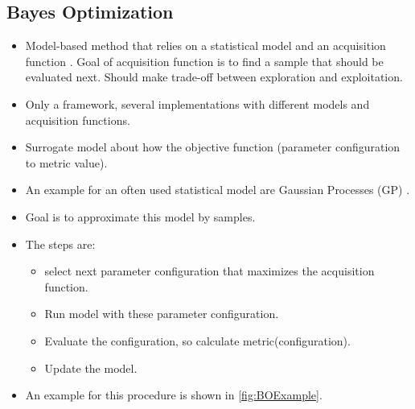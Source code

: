 \subsection{Bayes Optimization}

\begin{itemize}
    \item Model-based method that relies on a statistical model and an acquisition function \cite{ShahriariTakingOptimization, Frazier2018AOptimization, SnoekPracticalAlgorithms}.
    Goal of acquisition function is to find a sample that should be evaluated next.
    Should make trade-off between exploration and exploitation.
    \item Only a framework, several implementations with different models and acquisition functions.
    \item Surrogate model about how the objective function (parameter configuration to metric value).
    \item An example for an often used statistical model are Gaussian Processes (GP) \cite{ShahriariTakingOptimization}.
    \item Goal is to approximate this model by samples.
    \item The steps are:
    \begin{itemize}
        \item select next parameter configuration that maximizes the acquisition function.
        \item Run model with these parameter configuration.
        \item Evaluate the configuration, so calculate metric(configuration).
        \item Update the model.
    \end{itemize}
    \item An example for this procedure is shown in \cref{fig:BOExample}. 
    

\end{itemize}
